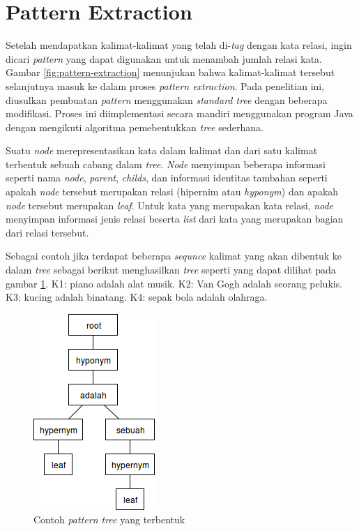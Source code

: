 %
\section{Pattern Extraction}
Setelah mendapatkan kalimat-kalimat yang telah di-\textit{tag} dengan kata relasi, ingin dicari \textit{pattern} yang dapat digunakan untuk menambah jumlah relasi kata. Gambar \ref{fig:pattern-extraction} menunjukan bahwa kalimat-kalimat tersebut selanjutnya masuk ke dalam proses \textit{pattern extraction}. Pada penelitian ini, diusulkan pembuatan \textit{pattern} menggunakan \textit{standard tree} dengan beberapa modifikasi. Proses ini diimplementasi secara mandiri menggunakan program Java dengan mengikuti algoritma pemebentukkan \textit{tree} sederhana.

Suatu \textit{\textit{node}} merepresentasikan kata dalam kalimat dan dari satu kalimat terbentuk sebuah cabang dalam \textit{tree}. \textit{Node} menyimpan beberapa informasi seperti nama \textit{\textit{node}}, \textit{parent}, \textit{childs}, dan informasi identitas tambahan seperti apakah \textit{\textit{node}} tersebut merupakan relasi (hipernim atau \textit{hyponym}) dan apakah \textit{\textit{node}} tersebut merupakan \textit{leaf}. Untuk kata yang merupakan kata relasi, \textit{\textit{node}} menyimpan informasi jenis relasi beserta \textit{list} dari kata yang merupakan bagian dari relasi tersebut. 

Sebagai contoh jika terdapat beberapa \textit{sequnce} kalimat yang akan dibentuk ke dalam \textit{tree} sebagai berikut menghasilkan \textit{tree} seperti yang dapat dilihat pada gambar \ref{fig:contoh-ptree}.
K1: {\tagHyponym}piano{\tagHyponym} adalah {\tagHypernym}alat musik{\tagHypernym}.
K2: {\tagHyponym}Van Gogh{\tagHyponym} adalah seorang {\tagHypernym}pelukis{\tagHypernym}.
K3: {\tagHyponym}kucing{\tagHyponym} adalah {\tagHypernym}binatang{\tagHypernym}.
K4: {\tagHyponym}sepak bola{\tagHyponym} adalah {\tagHypernym}olahraga{\tagHypernym}.

\begin{figure}
    \centering
    \includegraphics[scale=0.6]{pics/contoh-patterntree}
    \caption{Contoh \textit{pattern tree} yang terbentuk}
    \label{fig:contoh-ptree}
\end{figure}

